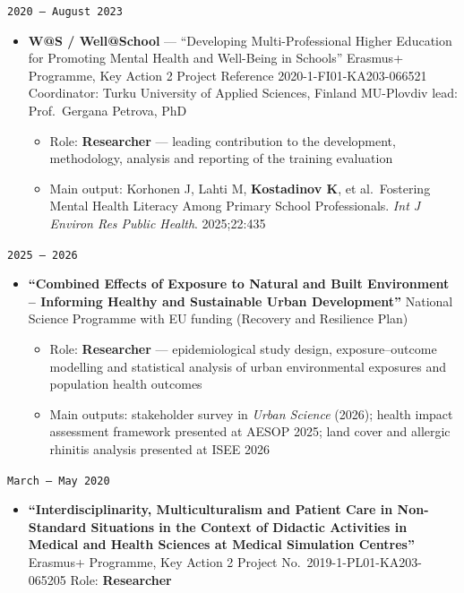 \documentclass[
  10.5pt,
  a4paper,
  DIV=11,
  numbers=noendperiod]{scrartcl}
\providecommand{\tightlist}{%
  \setlength{\itemsep}{0pt}\setlength{\parskip}{0pt}}
\let\oldtexttt\texttt
\renewcommand{\texttt}[1]{{\color{cvbronze}\small\oldtexttt{#1}}}
\begin{document}
\texttt{2020\ –\ August\ 2023}

\begin{itemize}
\tightlist
\item
  \textbf{W@S / Well@School} --- ``Developing Multi-Professional Higher
  Education for Promoting Mental Health and Well-Being in Schools''
  \textbar{} Erasmus+ Programme, Key Action 2 \textbar{} Project
  Reference 2020-1-FI01-KA203-066521 \textbar{} Coordinator: Turku
  University of Applied Sciences, Finland \textbar{} MU-Plovdiv lead:
  Prof.~Gergana Petrova, PhD

  \begin{itemize}
  \tightlist
  \item
    Role: \textbf{Researcher} --- leading contribution to the
    development, methodology, analysis and reporting of the training
    evaluation
  \item
    Main output: Korhonen J, Lahti M, \textbf{Kostadinov K}, et
    al.~Fostering Mental Health Literacy Among Primary School
    Professionals. \emph{Int J Environ Res Public Health}. 2025;22:435
  \end{itemize}
\end{itemize}

\texttt{2025\ –\ 2026}

\begin{itemize}
\tightlist
\item
  \textbf{``Combined Effects of Exposure to Natural and Built
  Environment -- Informing Healthy and Sustainable Urban Development''}
  \textbar{} National Science Programme with EU funding (Recovery and
  Resilience Plan)

  \begin{itemize}
  \tightlist
  \item
    Role: \textbf{Researcher} --- epidemiological study design,
    exposure--outcome modelling and statistical analysis of urban
    environmental exposures and population health outcomes
  \item
    Main outputs: stakeholder survey in \emph{Urban Science} (2026);
    health impact assessment framework presented at AESOP 2025; land
    cover and allergic rhinitis analysis presented at ISEE 2026
  \end{itemize}
\end{itemize}

\texttt{March\ –\ May\ 2020}

\begin{itemize}
\tightlist
\item
  \textbf{``Interdisciplinarity, Multiculturalism and Patient Care in
  Non-Standard Situations in the Context of Didactic Activities in
  Medical and Health Sciences at Medical Simulation Centres''}
  \textbar{} Erasmus+ Programme, Key Action 2 \textbar{} Project
  No.~2019-1-PL01-KA203-065205 \textbar{} Role: \textbf{Researcher}
\end{itemize}
\end{document}
